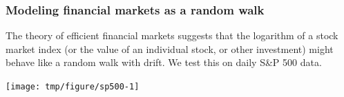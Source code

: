 \begin{frame}[fragile]

\frametitle{Modeling financial markets as a random walk}


The theory of efficient financial markets suggests that the logarithm of a stock market index (or the value of an individual stock, or other investment) might behave like a random walk with drift.
We test this on daily S\&P 500 data.

\vspace{-1mm}

\begin{knitrout}\small
{}\color{fgcolor}\begin{kframe}
\begin{alltt}
 \hlkwb{<-} \hldef{(}\hldef{,}\hldef{=}\hldef{,}\hldef{=}\hldef{)}
 \hlkwb{<-} \hlopt{$}
 \hlkwb{<-} \hlopt{$}
\hlopt{~}\hldef{=}\hldef{,}\hldef{=}\hldef{,}\hldef{=}\hldef{,}\hldef{=}\hldef{)}
\end{alltt}
\end{kframe}
\end{knitrout}


\vspace{-5mm}

\begin{knitrout}\small
{}\color{fgcolor}

{\centering \texttt{[image: tmp/figure/sp500-1]} 

}


\end{knitrout}


\end{frame}

